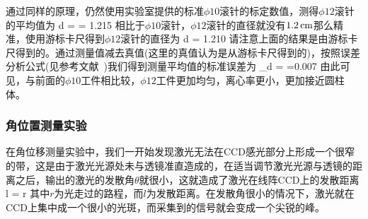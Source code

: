 \documentclass{ctexart}
\begin{document}
通过同样的原理，仍然使用实验室提供的标准$\phi 10$滚针的标定数值，测得$\phi 12$滚针的平均值为
\beq
d =  = 1.215 \SIcm
\eeq
相比于$\phi 10$滚针，$\phi 12$滚针的直径就没有$1.2\,\mathrm{cm}$那么精准，使用游标卡尺得到$\phi 12$滚针的直径为
\beq
d = 1.210 \SIcm
\eeq
请注意上面的结果是由游标卡尺得到的。通过测量值减去真值(这里的真值认为是从游标卡尺得到的)，按照误差分析公式(见参考文献~\cite{error})我们得到测量平均值的标准误差为
\beq
\sigma_{d} =  =0.007 \SIcm
\eeq
由此可见，与前面的$\phi 10$工件相比较，$\phi 12$工件更加均匀，离心率更小，更加接近圆柱体。
\subsubsection{角位置测量实验}
在角位移测量实验中，我们一开始发现激光无法在CCD感光部分上形成一个很窄的带，这是由于激光光源处未与透镜准直造成的，在适当调节激光光源与透镜的距离之后，输出的激光的发散角$\theta$就很小，这就造成了激光在线阵CCD上的发散距离
\beq
l = r\theta
\eeq
其中$r$为光走过的路程，而$l$为发散距离。在发散角很小的情况下，激光就在CCD上集中成一个很小的光斑，而采集到的信号就会变成一个尖锐的峰。
\end{document}
